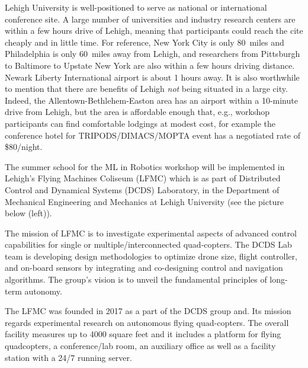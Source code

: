 Lehigh University is well-positioned to serve as national or international conference site.   A large number of universities and industry research centers are within a few hours drive of Lehigh, meaning that participants could reach the cite cheaply and in little time.  For reference, New York City is only 80~miles and Philadelphia is only 60~miles away from Lehigh, and researchers from Pittsburgh to Baltimore to Upstate New York are also within a few hours driving distance. Newark Liberty International airport  is about 1 hours away.  It is also worthwhile to mention that there are benefits of Lehigh \emph{not} being situated in a large city.  Indeed, the Allentown-Bethlehem-Easton area has an airport within a 10-minute drive from Lehigh, but the area is affordable enough that, e.g., workshop participants can find comfortable lodgings at modest cost, for example the conference hotel for TRIPODS/DIMACS/MOPTA event has a negotiated rate of \$80/night. 




The summer school for the ML in Robotics workshop  will be implemented in Lehigh's Flying Machines Coliseum (LFMC) which is as part of Distributed Control and Dynamical Systems (DCDS) Laboratory, in the Department of Mechanical Engineering and Mechanics at Lehigh University (see the picture below (left)). 

The mission of LFMC is to investigate experimental aspects of  advanced control capabilities for single or multiple/interconnected quad-copters. The DCDS Lab team is developing design methodologies to optimize drone size, flight controller, and on-board sensors by integrating and co-designing control and navigation algorithms. The group's vision is to unveil the fundamental principles of long-term autonomy.

The LFMC was founded in 2017 as a part of the DCDS group and. Its mission regards experimental research on autonomous flying quad-copters. The overall facility measures up to 4000 square feet and it includes a platform for flying quadcopters, a conference/lab room, an auxiliary office as well as a facility station with a 24/7 running server.

